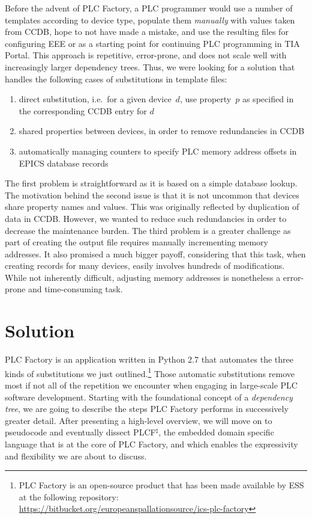 \documentclass[a4paper,
              ]{jacow}
\begin{document}
Before the advent of PLC Factory, a PLC programmer would use a number of templates according to device type, populate them \emph{manually} with values taken from CCDB, hope to not have made a mistake, and use the resulting files for configuring EEE or as a starting point for continuing PLC programming in TIA Portal. This approach is repetitive, error-prone, and does not scale well with increasingly larger dependency trees. Thus, we were looking for a solution that handles the following cases of substitutions in template files:

\begin{enumerate}

\item direct substitution, i.e.\ for a given device~$d$, use property~$p$ as specified in the corresponding CCDB entry for $d$

\item shared properties between devices, in order to remove redundancies in CCDB

\item automatically managing counters to specify PLC memory address offsets in EPICS database records

\end{enumerate}

The first problem is straightforward as it is based on a simple database lookup. The motivation behind the second issue is that it is not uncommon that devices share property names and values. This was originally reflected by duplication of data in CCDB. However, we wanted to reduce such redundancies in order to decrease the maintenance burden. The third problem is a greater challenge as part of creating the output file requires manually incrementing memory addresses. It also promised a much bigger payoff, considering that this task, when creating records for many devices, easily involves hundreds of modifications. While not inherently difficult, adjusting memory addresses is nonetheless a error-prone and time-consuming task. 



\section{Solution}
PLC Factory is an application written in Python 2.7 that automates the three kinds of substitutions we just outlined.\footnote{PLC Factory is an open-source product that has been made available by ESS at the following repository: \url{https://bitbucket.org/europeanspallationsource/ics-plc-factory} } Those automatic substitutions remove most if not all of the repetition we encounter when engaging in large-scale PLC software development. Starting with the foundational concept of a \emph{dependency tree}, we are going to describe the steps PLC Factory performs in successively greater detail. After presenting a high-level overview, we will move on to pseudocode and eventually dissect PLCF$^\sharp$, the embedded domain specific language that is at the core of PLC Factory, and which enables the expressivity and flexibility we are about to discuss.
\end{document}
